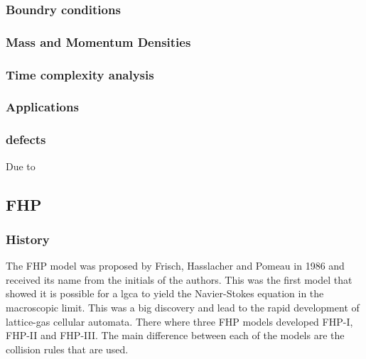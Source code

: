 \documentclass[a4paper,10pt]{article}
\begin{document}
\subsubsection{Boundry conditions}
\subsubsection{Mass and Momentum Densities}
\subsubsection{Time complexity analysis}
\subsubsection{Applications}
\subsubsection{defects}
Due to 
\subsection{FHP}
\subsubsection{History}
The FHP model was proposed by Frisch, Hasslacher and Pomeau in 1986 and received its name from the initials of the authors. This was the first model that showed it is possible for a \acrshort{lgca} to yield the Navier-Stokes equation in the macroscopic limit. This was a big discovery and lead to the rapid development of lattice-gas cellular automata. There where three FHP models developed FHP-I, FHP-II and FHP-III.
The main difference between each of the models are the collision rules that are used.
\end{document}

